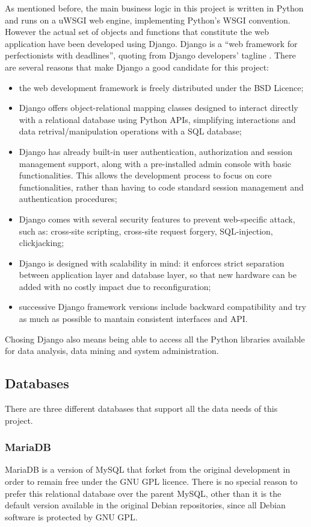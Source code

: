 As mentioned before, the main business logic in this project is written in
Python and runs on a uWSGI web engine, implementing Python's WSGI convention.
However the actual set of objects and functions that constitute the web application have been developed using Django.
Django is a ``web framework for perfectionists with deadlines'', quoting from
Django developers' tagline \cite{Django}. There are several reasons that make
Django a good candidate for this project:
\begin{itemize}
  \item the web development framework is freely distributed under the BSD
  Licence;
  \item Django offers object-relational mapping classes designed to interact
  directly with a relational database using Python APIs, simplifying
  interactions and data retrival/manipulation operations with a SQL
  database;
  \item Django has already built-in user authentication, authorization and
  session management support, along with a pre-installed admin console with basic
  functionalities. This allows the development process to focus on core
  functionalities, rather than having to code standard session management and
  authentication procedures;
  \item Django comes with several security features to prevent web-specific
  attack, such as: cross-site scripting, cross-site request forgery,
  SQL-injection, clickjacking;
  \item Django is designed with scalability in mind: it enforces strict
  separation between application layer and database layer, so that new hardware
  can be added with no costly impact due to reconfiguration;
  \item successive Django framework versions include backward compatibility and
  try as much as possible to mantain consistent interfaces and API.
\end{itemize}

Chosing Django also means being able to access all the Python libraries
available for data analysis, data mining and system administration.

\subsection{Databases}
There are three different databases that support all the data needs of this
project.

\subsubsection{MariaDB}
MariaDB is a version of MySQL that forket from the original development in order
to remain free under the GNU GPL licence. There is no special reason to prefer
this relational database over the parent MySQL, other than it is the default
version available in the original Debian repositories, since all Debian software
is protected by GNU GPL.


